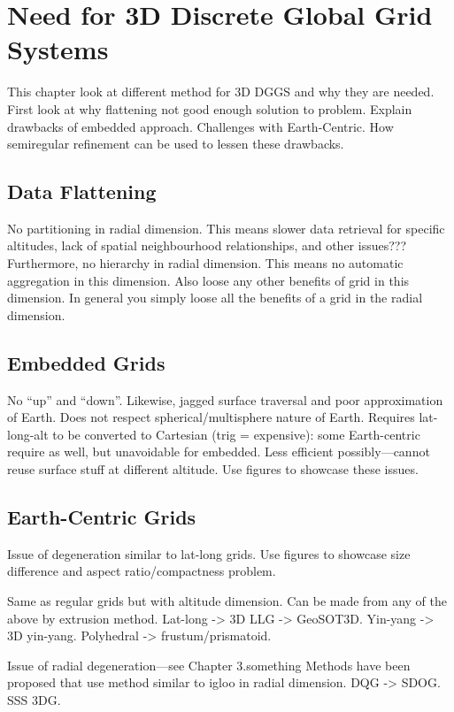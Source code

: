 \chapter{Need for 3D Discrete Global Grid Systems} \label{chap:3ddggs}
This chapter look at different method for 3D DGGS and why they are needed.
First look at why flattening not good enough solution to problem.
Explain drawbacks of embedded approach.
Challenges with Earth-Centric.
How semiregular refinement can be used to lessen these drawbacks.


\section{Data Flattening}
No partitioning in radial dimension.
This means slower data retrieval for specific altitudes, lack of spatial neighbourhood relationships, and other issues???
Furthermore, no hierarchy in radial dimension.
This means no automatic aggregation in this dimension.
Also loose any other benefits of grid in this dimension.
In general you simply loose all the benefits of a grid in the radial dimension.


\section{Embedded Grids}
No ``up'' and ``down''.
Likewise, jagged surface traversal and poor approximation of Earth.
Does not respect spherical/multisphere nature of Earth.
Requires lat-long-alt to be converted to Cartesian (trig = expensive): some Earth-centric require as well, but unavoidable for embedded.
Less efficient possibly---cannot reuse surface stuff at different altitude.
Use figures to showcase these issues.


\section{Earth-Centric Grids}
Issue of degeneration similar to lat-long grids.
Use figures to showcase size difference and aspect ratio/compactness problem.



Same as regular grids but with altitude dimension.
Can be made from any of the above by extrusion method.
Lat-long -> 3D LLG -> GeoSOT3D.
Yin-yang -> 3D yin-yang.
Polyhedral -> frustum/prismatoid.
\cite{yoo2019concept}
\cite{sun20153d}
\cite{yoshida2004application}
\cite{kageyama2005geodynamo}
\cite{tackley2008modelling}


Issue of radial degeneration---see Chapter 3.something
Methods have been proposed that use method similar to igloo in radial dimension.
DQG -> SDOG.
SSS 3DG.
\cite{yu2009sdog}
\cite{yu2012large-scale}
\cite{yu2012lithosphere}
\cite{gang2013sphere} 
\cite{wang2013global}





